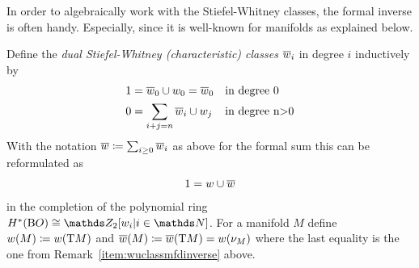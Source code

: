 In order to algebraically work with the Stiefel-Whitney classes, the
formal inverse is often handy. Especially, since it is well-known for
manifolds as explained below.
\begin{Def}
  Define the \emph{dual Stiefel-Whitney (characteristic) classes}
  $\overline{w}_{i}$ in degree $i$ inductively by
  \begin{align*}
    1 &= \overline{w}_{0}\cup w_{0} = \overline{w}_{0}    &&\text{in degree 0}\\
    0 &= \sum_{i+j=n} \overline{w}_{i}\cup w_{j}  &&\text{in degree n>0}
  \end{align*}
  With the notation $\overline{w}\coloneqq \sum_{i\geq0} \overline{w}_{i}$ as above
  for the formal sum this can be reformulated as
  \begin{gather*}
    1 = w\cup\overline{w}
  \end{gather*}
  in the completion of the polynomial ring $\H^*(\BO)\cong\Zmod2[\ws{i}|i\in\Nat]$.
  For a manifold $M$ define
  ${w}(M) \coloneqq {w}(\mathrm{T}M)$ and
  ${\overline{w}}(M) \coloneqq {\overline{w}}(\mathrm{T}M) = {w}(\nu_{M})$
  where the last equality is the one from
  Remark~\ref{item:wuclassmfdinverse}
  above.
\end{Def}

